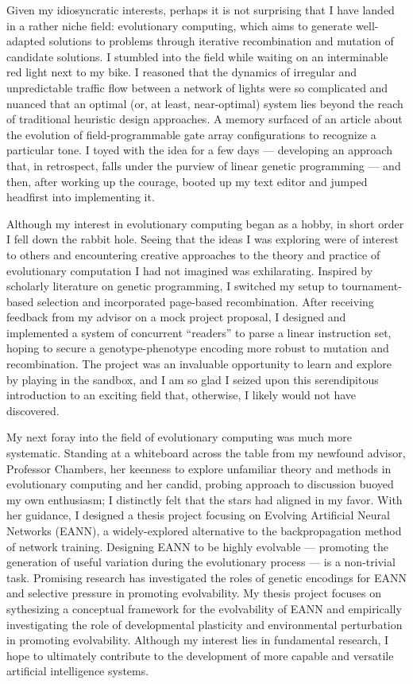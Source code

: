\documentclass[12pt]{book}
\begin{document}
Given my idiosyncratic interests, perhaps it is not surprising that I have landed in a rather niche field: evolutionary computing, which aims to generate well-adapted solutions to problems through iterative recombination and mutation of candidate solutions. I stumbled into the field while waiting on an interminable red light next to my bike. I reasoned that the dynamics of irregular and unpredictable traffic flow between a network of lights were so complicated and nuanced that an optimal (or, at least, near-optimal) system lies beyond the reach of traditional heuristic design approaches. A memory surfaced of an article about the evolution of field-programmable gate array configurations to recognize a particular tone. I toyed with the idea for a few days --- developing an approach that, in retrospect, falls under the purview of linear genetic programming --- and then, after working up the courage, booted up my text editor and jumped headfirst into implementing it. 

Although my interest in evolutionary computing began as a hobby, in short order I fell down the rabbit hole. Seeing that the ideas I was exploring were of interest to others and encountering creative approaches to the theory and practice of evolutionary computation I had not imagined was exhilarating. Inspired by scholarly literature on genetic programming, I switched my setup to tournament-based selection and incorporated page-based recombination. After receiving feedback from my advisor on a mock project proposal, I designed and implemented a system of concurrent ``readers'' to parse a linear instruction set, hoping to secure a genotype-phenotype encoding more robust to mutation and recombination. The project was an invaluable opportunity to learn and explore by playing in the sandbox, and I am so glad I seized upon this serendipitous introduction to an exciting field that, otherwise, I likely would not have discovered.

My next foray into the field of evolutionary computing was much more systematic. Standing at a whiteboard across the table from my newfound advisor, Professor Chambers, her keenness to explore unfamiliar theory and methods in evolutionary computing and her candid, probing approach to discussion buoyed my own enthusiasm; I distinctly felt that the stars had aligned in my favor. With her guidance, I designed a thesis project focusing on Evolving Artificial Neural Networks (EANN), a widely-explored alternative to the backpropagation method of network training. Designing EANN to be highly evolvable  ---  promoting the generation of useful variation during the evolutionary process  ---  is a non-trivial task. Promising research has investigated the roles of genetic encodings for EANN and selective pressure in promoting evolvability. My thesis project focuses on sythesizing a conceptual framework for the evolvability of EANN and empirically investigating the role of developmental plasticity and environmental perturbation in promoting evolvability. Although my interest lies in fundamental research, I hope to ultimately contribute to the development of more capable and versatile artificial intelligence systems.
\end{document}
